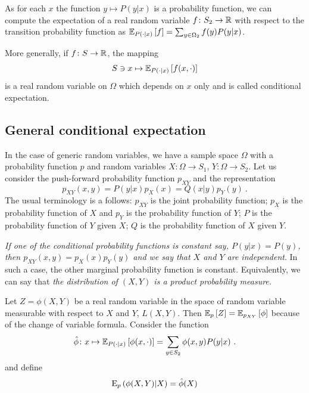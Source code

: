 \documentclass[12pt,a4paper]{amsart}
\theoremstyle{plain}%
\theoremstyle{definition}
\theoremstyle{remark}
\begin{document}
As for each $x$ the function $y \mapsto P(y|x)$ is a probability
function, we can compute the expectation of a real random variable $f
\colon S_2 \to \mathbb{R}$ with respect to the transition probability
function as $\operatorname{\mathbb E}_{P(\cdot|x)}\left[f\right] = \sum_{y\in\Omega_2} f(y)
P(y|x)$.

More generally, if $f \colon S \to \mathbb{R}$, the mapping
\begin{equation*}
  S \ni x \mapsto \operatorname{\mathbb E}_{P(\cdot|x)}\left[f(x,\cdot)\right] 
\end{equation*}
is a real random variable on $\Omega$ which depends on $x$ only and is
called conditional expectation.

\subsection{General conditional expectation}
\label{sec:condexp}

In the case of generic random variables, we have a sample space $\Omega$ with a probability function $p$ and random variables $X \colon \Omega \to S_1$, $Y \colon \Omega \to S_2$. Let us consider the push-forward probability function $p_{XY}$ and the representation
\begin{equation*}
  p_{XY}(x,y) = P(y|x)p_X(x) = Q(x|y) p_Y(y) \ .
\end{equation*}
The usual terminology is a follows:
$p_{XY}$ is the joint probability function; $p_X$ is the probability function of $X$ and $p_Y$ is the probability function of $Y$; $P$ is the probability function of $Y$ given $X$; $Q$ is the probability function of $X$ given $Y$.

\emph{If one of the conditional probability functions is constant say, $P(y|x) = P(y)$, then $p_{XY}(x,y) = p_X(x) p_Y(y)$ and we say that $X$ and $Y$ are independent}. In such a case, the other marginal probability function is constant. Equivalently, we can say that \emph{the distribution of $(X,Y)$ is a product probability measure.}

Let $Z = \phi(X,Y)$ be a real random variable in the space of random variable measurable with respect to $X$ and $Y$, $L(X,Y)$. Then
$\operatorname{\mathbb E}_{p}\left[Z\right] = \operatorname{\mathbb E}_{p_{XY}}\left[\phi\right]$ because of the change of
variable formula. Consider the function
\begin{equation*}
 \hat \phi \colon x \mapsto \operatorname{\mathbb E}_{P(\cdot|x)}\left[\phi(x,\cdot)\right] = \sum_{y\in S_2} \phi(x,y) P(y|x) \ .
\end{equation*}
and define
\begin{equation*}
  \operatorname{E}_{p}\left(\phi(X,Y) \middle| X\right) = \hat \phi(X)
\end{equation*}
\end{document}
